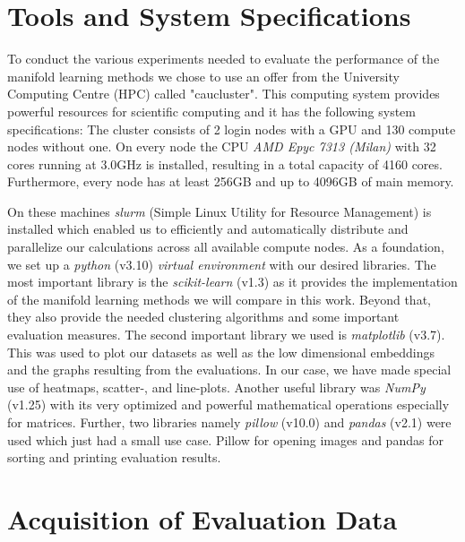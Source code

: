 \section{Tools and System Specifications} \label{sec:toolsandsysspec}

To conduct the various experiments needed to evaluate the performance of the manifold learning methods we chose to use an offer from the University Computing Centre (HPC) called "caucluster"\footnotemark. This computing system provides powerful resources for scientific computing and it has the following system specifications:
The cluster consists of 2 login nodes with a GPU and 130 compute nodes without one. On every node the CPU \textit{AMD Epyc 7313 (Milan)} with 32 cores running at 3.0GHz is installed, resulting in a total capacity of 4160 cores. Furthermore, every node has at least 256GB and up to 4096GB of main memory.

On these machines \textit{slurm} (Simple Linux Utility for Resource Management) is installed which enabled us to efficiently and automatically distribute and parallelize our calculations across all available compute nodes. As a foundation, we set up a \textit{python} (v3.10) \textit{virtual environment} with our desired libraries. The most important library is the \textit{scikit-learn} (v1.3) as it provides the implementation of the manifold learning methods we will compare in this work. Beyond that, they also provide the needed clustering algorithms and some important evaluation measures. The second important library we used is \textit{matplotlib} (v3.7). This was used to plot our datasets as well as the low dimensional embeddings and the graphs resulting from the evaluations. In our case, we have made special use of heatmaps, scatter-, and line-plots. Another useful library was \textit{NumPy} (v1.25) with its very optimized and powerful mathematical operations especially for matrices. Further, two libraries namely \textit{pillow} (v10.0) and \textit{pandas} (v2.1) were used which just had a small use case. Pillow for opening images and pandas for sorting and printing evaluation results.

\section{Acquisition of Evaluation Data} \label{sec:acq_data}

